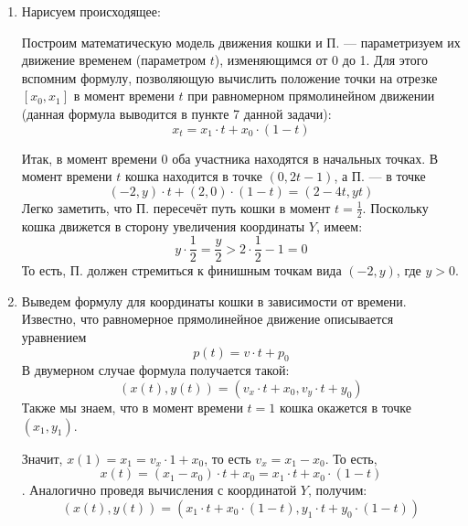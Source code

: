
\begin{enumerate}
\item Нарисуем происходящее:

\begin{center}\end{center}

Построим математическую модель движения кошки и П. --- параметризуем
их движение временем (параметром $t$), изменяющимся от 0 до 1.
Для этого вспомним формулу, позволяющую вычислить положение точки на отрезке
$[x_0,x_1]$ в момент времени $t$ при равномерном прямолинейном движении (данная
формула выводится в пункте 7 данной задачи):
$$x_t = x_1 \cdot t + x_0 \cdot (1-t)$$

Итак, в момент времени 0 оба участника находятся в начальных точках.
В момент времени $t$ кошка находится в точке $(0,2t-1)$,
а П. --- в точке $$(-2,y)\cdot t + (2,0)\cdot (1-t) = (2-4t,yt)$$
Легко заметить, что П. пересечёт путь кошки в момент $t=\frac{1}{2}$.
Поскольку кошка движется в сторону увеличения координаты $Y$, имеем:
$$y\cdot\frac{1}{2} = \frac{y}{2} > 2\cdot\frac{1}{2} -1 = 0$$
То есть, П. должен стремиться к финишным точкам вида $(-2,y)$, где $y > 0$.

\item Выведем формулу для координаты кошки в зависимости от времени.
Известно, что равномерное прямолинейное движение описывается уравнением
$$p(t) = v\cdot t + p_0$$
В двумерном случае формула получается такой:
$$(x(t),y(t)) = (v_x\cdot t + x_0,v_y\cdot t + y_0)$$
Также мы знаем, что в момент времени $t=1$ кошка окажется в точке $(x_1,y_1)$.

Значит, $x(1) = x_1 = v_x \cdot 1 + x_0$, то есть $v_x = x_1 - x_0$.
То есть, $$x(t) = (x_1 - x_0) \cdot t + x_0 = x_1 \cdot t + x_0 \cdot (1-t)$$.
Аналогично проведя вычисления с координатой $Y$, получим:
$$(x(t),y(t)) = (x_1 \cdot t + x_0 \cdot (1-t), y_1 \cdot t + y_0 \cdot (1-t))$$

\end{enumerate}
